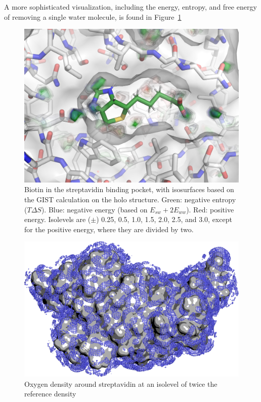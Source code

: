 \documentclass[9pt,tutorial]{livecoms}
\begin{document}
A more sophisticated visualization, including the energy, entropy, and free energy of removing a single water molecule, is found in Figure~\ref{fig-binding-pocket.png}

\begin{figure}
	\centering
	\includegraphics[width=\linewidth]{figures/binding-pocket-energy-levels.png}
	\caption{Biotin in the streptavidin binding pocket, with isosurfaces based on the GIST calculation on the holo structure. Green: negative entropy ($T\Delta S$). Blue: negative energy (based on $E_{sw} + 2E_{ww}$). Red: positive energy. Isolevels are ($\pm$) 0.25, 0.5, 1.0, 1.5, 2.0, 2.5, and 3.0, except for the positive energy, where they are divided by two.}\label{fig-binding-pocket.png}
\end{figure}

\begin{figure}
	\centering
	\includegraphics[width=1.0\linewidth]{figures/streptavidin_gO_high_surf.png}
	\caption{Oxygen density around streptavidin at an isolevel of twice the reference density}\label{fig-streptavidin_gO}
\end{figure}
\end{document}
